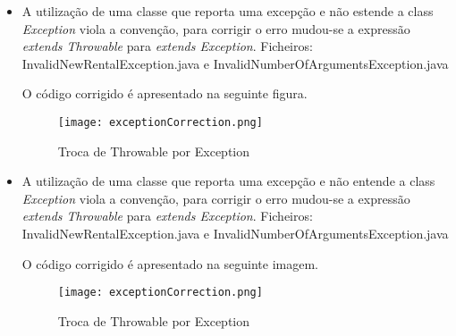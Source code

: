 \begin{itemize}
\item A utilização de uma classe que reporta uma excepção e não estende a class \textit{Exception} viola a convenção, para corrigir o erro mudou-se a expressão \textit{extends Throwable} para \textit{ extends Exception}.\newline
 Ficheiros: InvalidNewRentalException.java e InvalidNumberOfArgumentsException.java\newline

\par O código corrigido é apresentado na seguinte figura.

 \begin{figure}[H]

  \centering

  \texttt{[image: exceptionCorrection.png]}

  \caption {Troca de Throwable por Exception}

  \label {fig12}

\end{figure}
\end{itemize}

\begin{itemize}
\item A utilização de uma classe que reporta uma excepção e não entende a class \textit{Exception} viola a convenção, para corrigir o erro mudou-se a expressão \textit{extends Throwable} para \textit{ extends Exception}.\newline
 Ficheiros: InvalidNewRentalException.java e InvalidNumberOfArgumentsException.java\newline

\par O código corrigido é apresentado na seguinte imagem.

 \begin{figure}[H]

  \centering

  \texttt{[image: exceptionCorrection.png]}

  \caption {Troca de Throwable por Exception}

  \label {fig13}

\end{figure}
\end{itemize}

